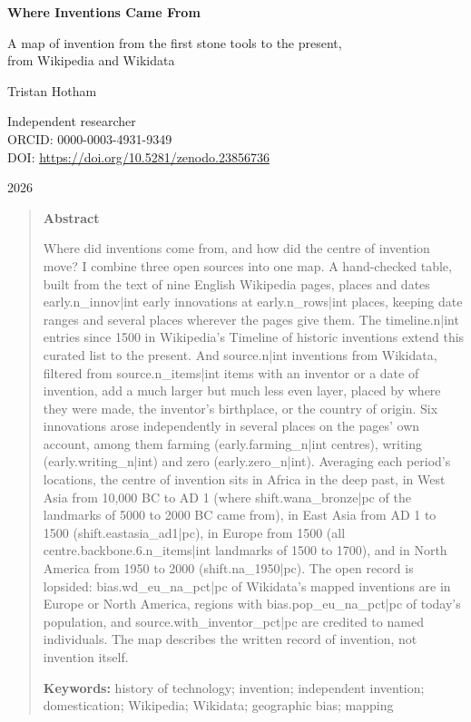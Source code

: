 \documentclass[11pt,a4paper]{article}
\begin{document}
\begin{center}
{\Large\bfseries Where Inventions Came From\par}
\vspace{0.4em}
{\large A map of invention from the first stone tools to the present,\\from Wikipedia and Wikidata\par}
\vspace{1.2em}
{\large Tristan Hotham\par}
\vspace{0.3em}
{\small Independent researcher\\
ORCID: 0000-0003-4931-9349\\
DOI: \href{https://doi.org/10.5281/zenodo.23856736}{https://doi.org/10.5281/zenodo.23856736}\par}
\vspace{0.8em}
2026
\end{center}

\begin{quote}
\small
\begin{center}\textbf{Abstract}\end{center}
Where did inventions come from, and how did the centre of invention move? I combine three open sources into one map. A hand-checked table, built from the text of nine English Wikipedia pages, places and dates {{early.n_innov|int}} early innovations at {{early.n_rows|int}} places, keeping date ranges and several places wherever the pages give them. The {{timeline.n|int}} entries since 1500 in Wikipedia's Timeline of historic inventions extend this curated list to the present. And {{source.n|int}} inventions from Wikidata, filtered from {{source.n_items|int}} items with an inventor or a date of invention, add a much larger but much less even layer, placed by where they were made, the inventor's birthplace, or the country of origin. Six innovations arose independently in several places on the pages' own account, among them farming ({{early.farming_n|int}} centres), writing ({{early.writing_n|int}}) and zero ({{early.zero_n|int}}). Averaging each period's locations, the centre of invention sits in Africa in the deep past, in West Asia from 10,000 BC to AD 1 (where {{shift.wana_bronze|pc}} of the landmarks of 5000 to 2000 BC came from), in East Asia from AD 1 to 1500 ({{shift.eastasia_ad1|pc}}), in Europe from 1500 (all {{centre.backbone.6.n_items|int}} landmarks of 1500 to 1700), and in North America from 1950 to 2000 ({{shift.na_1950|pc}}). The open record is lopsided: {{bias.wd_eu_na_pct|pc}} of Wikidata's mapped inventions are in Europe or North America, regions with {{bias.pop_eu_na_pct|pc}} of today's population, and {{source.with_inventor_pct|pc}} are credited to named individuals. The map describes the written record of invention, not invention itself.

\textbf{Keywords:} history of technology; invention; independent invention; domestication; Wikipedia; Wikidata; geographic bias; mapping
\end{quote}
\end{document}
